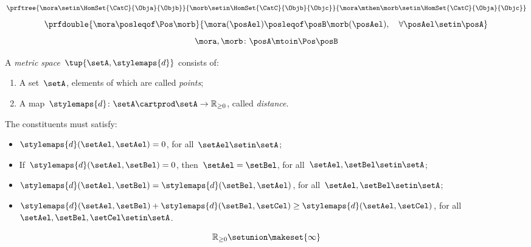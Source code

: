 {\begin{forslides}
\begin{equation}
            \label{eq:poset_bool_m}
            \prftree{\mora \setin \HomSet{\CatC}{\Obja}{\Objb}}{\morb \setin \HomSet{\CatC}{\Objb}{\Objc}}{{\mora\mthen \morb \setin \HomSet{\CatC}{\Obja}{\Objc}}}
        \end{equation}
        \begin{equation}
            \label{eq:poset_pos_a}
            \prfdouble{
                \mora \posleqof\Pos \morb}{\mora(\posAel)\posleqof\posB \morb(\posAel), \quad \forall \posAel \setin \posA}
        \end{equation}
        \begin{equation}
            \label{eq:poset_pos_b}
            \mora,\morb\colon \posA\mtoin\Pos \posB
        \end{equation}
        \begin{definition}
            \label{def:metric_space}
            A \emph{metric space}~$\tup{\setA,\stylemaps{d}}$ consists of:
            \begin{enumerate}
                \item A set~$\setA$, elements of which are called \emph{points};
                \item A map~$\stylemaps{d}\colon \setA\cartprod \setA \to \mathbb{R}_{\geq 0}$, called \emph{distance}.
            \end{enumerate}
            The constituents must satisfy:
            \begin{itemize}
                \item $\stylemaps{d}(\setAel,\setAel)=0$, for all~$\setAel\setin \setA$;
                \item If~$\stylemaps{d}(\setAel, \setBel)=0$, then~$\setAel=\setBel$, for all~$\setAel,\setBel\setin \setA$;
                \item $\stylemaps{d}(\setAel, \setBel)=\stylemaps{d}(\setBel, \setAel)$, for all~$\setAel,\setBel\setin \setA$;
                \item $\stylemaps{d}(\setAel, \setBel)+\stylemaps{d}(\setBel, \setCel)\geq \stylemaps{d}(\setAel, \setCel)$, for all~$\setAel,\setBel,\setCel\setin \setA$.
            \end{itemize}
        \end{definition}
        \begin{equation}
            \label{eq:r_with_inft}
            \mathbb{R}_{\geq 0}\setunion \makeset{\infty}
        \end{equation}
        \begin{equation}

\end{equation}
\end{forslides}}
